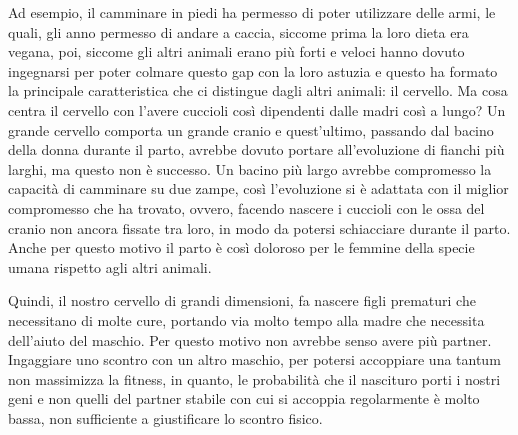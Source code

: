 \documentclass[12pt]{book} %
\begin{document}
Ad esempio, il camminare in piedi ha permesso di poter utilizzare delle armi, le quali, gli anno permesso di andare a
caccia, siccome prima la loro dieta era vegana, poi, siccome gli altri animali erano più forti e veloci hanno dovuto
ingegnarsi per poter colmare questo gap con la loro astuzia e questo ha formato la principale caratteristica che ci
distingue dagli altri animali: il cervello. Ma cosa centra il cervello con l'avere cuccioli così
dipendenti dalle madri così a lungo? Un grande cervello comporta un grande cranio e quest'ultimo,
passando dal bacino della donna durante il parto, avrebbe dovuto portare all'evoluzione di fianchi
più larghi, ma questo non è successo. Un bacino più largo avrebbe compromesso la capacità di camminare su due zampe,
così l'evoluzione si è adattata con il miglior compromesso che ha trovato, ovvero, facendo nascere
i cuccioli con le ossa del cranio non ancora fissate tra loro, in modo da potersi schiacciare durante il parto. Anche
per questo motivo il parto è così doloroso per le femmine della specie umana rispetto agli altri animali. 

Quindi, il nostro cervello di grandi dimensioni, fa nascere figli prematuri che necessitano di molte cure, portando via
molto tempo alla madre che necessita dell'aiuto del maschio. Per questo motivo non avrebbe senso
avere più partner. Ingaggiare uno scontro con un altro maschio, per potersi accoppiare una tantum non massimizza la
fitness, in quanto, le probabilità che il nascituro porti i nostri geni e non quelli del partner stabile con cui si
accoppia regolarmente è molto bassa, non sufficiente a giustificare lo scontro fisico.
\end{document}
